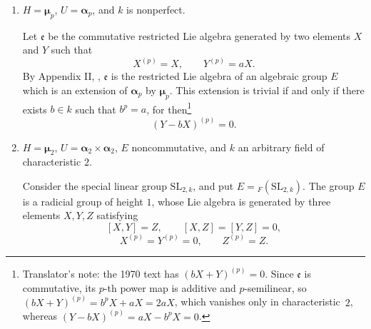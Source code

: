\begin{enumerate}
\item[(c)] 
  \(H=\boldsymbol\mu_p\), \(U=\boldsymbol\alpha_p\), and \(k\)
  is nonperfect.

  Let \(\mathfrak e\) be the commutative restricted Lie algebra
  generated by two elements \(X\) and \(Y\) such that
  \[
    X^{(p)}=X,\qquad Y^{(p)}=aX.
  \]
  By Appendix II, , \(\mathfrak e\) is the restricted Lie
  algebra of an algebraic group \(E\) which is an extension of
  \(\boldsymbol\alpha_p\) by \(\boldsymbol\mu_p\).  This
  extension is trivial if and only if there exists \(b\in k\)
  such that \(b^p=a\), for then\footnote{Translator's note: the 1970 text
  has \((bX+Y)^{(p)}=0\). Since \(\mathfrak e\) is commutative, its
  \(p\)-th power map is additive and \(p\)-semilinear, so
  \((bX+Y)^{(p)}=b^pX+aX=2aX\), which vanishes only in
  characteristic~\(2\), whereas \((Y-bX)^{(p)}=aX-b^pX=0\).}
  \[
    (Y-bX)^{(p)}=0.
  \]

\item[(d)] 
  \(H=\boldsymbol\mu_2\), \(U=\boldsymbol\alpha_2\times
  \boldsymbol\alpha_2\), \(E\) noncommutative, and \(k\) an arbitrary field
  of characteristic \(2\).

  Consider the special linear group \(\mathrm{SL}_{2,k}\), and
  put \(E={}_F(\mathrm{SL}_{2,k})\).  The group \(E\) is a radicial
  group of height \(1\), whose Lie algebra is generated by three
  elements \(X,Y,Z\) satisfying
  \[
    [X,Y]=Z,\qquad [X,Z]=[Y,Z]=0,
  \]
  \[
    X^{(p)}=Y^{(p)}=0,\qquad Z^{(p)}=Z.
  \]
\end{enumerate}
